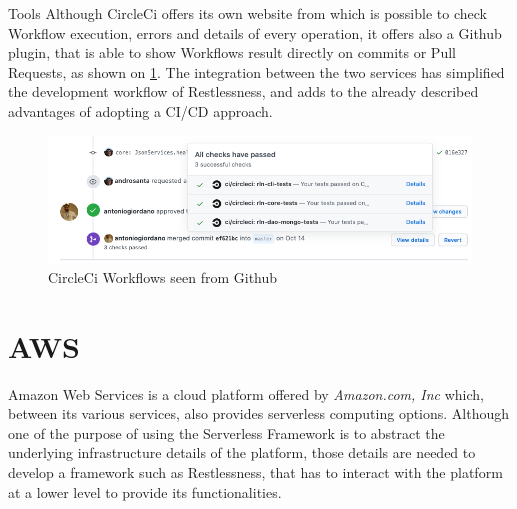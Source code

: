 \begin{chapter}{Tools}
    Although CircleCi offers its own website from which is possible to check Workflow
    execution, errors and details of every operation, it offers also a Github plugin,
    that is able to show Workflows result directly on commits or Pull Requests, as
    shown on \ref{fig:ci_github_integration}. The integration between the two
    services has simplified the development workflow of Restlessness, and adds to
    the already described advantages of adopting a CI/CD approach.



    \begin{figure}
        \centering
        \includegraphics[width=\linewidth]{source/images/ci-github-integration.png}
        \caption{CircleCi Workflows seen from Github}
        \label{fig:ci_github_integration}
    \end{figure}

    \section{AWS}
    Amazon Web Services is a cloud platform offered by \textit{Amazon.com, Inc}
    which, between its various services, also provides serverless computing options.
    Although one of the purpose of using the Serverless Framework is to abstract
    the underlying infrastructure details of the platform, those details are needed
    to develop a framework such as Restlessness, that has to interact with the
    platform at a lower level to provide its functionalities.


\end{chapter}
